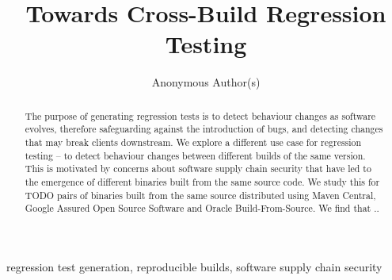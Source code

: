 \documentclass[conference]{IEEEtran}
\begin{document}
\title{Towards Cross-Build Regression Testing}


\author{Anonymous Author(s)}

\maketitle

\begin{abstract}
	The purpose of generating regression tests is to detect behaviour changes as software evolves, therefore safeguarding against the introduction of bugs, and detecting changes that may break  clients downstream. We explore a different use case for regression testing – to detect behaviour changes  between different builds of the same version. This is motivated by concerns about software supply chain security that have led to the emergence of different binaries built from the same source code. We study this for TODO pairs of binaries built from the same source distributed using Maven Central, Google Assured Open Source Software and Oracle Build-From-Source. 
We find that ..

\end{abstract}

\begin{IEEEkeywords}
regression test generation, reproducible builds, software supply chain security
\end{IEEEkeywords}
\end{document}
